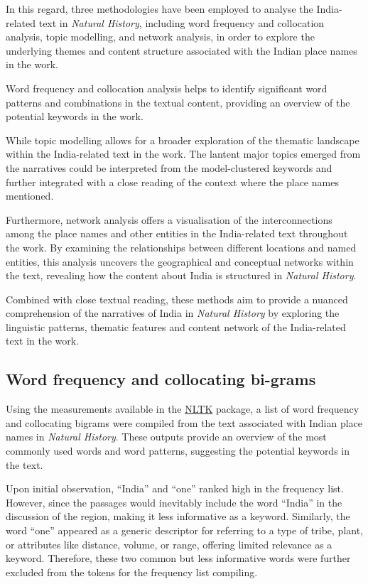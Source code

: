 \documentclass[
  12pt,
]{article}
\begin{document}
In this regard, three methodologies have been employed to analyse the
India-related text in \emph{Natural History}, including word frequency
and collocation analysis, topic modelling, and network analysis, in
order to explore the underlying themes and content structure associated
with the Indian place names in the work.

Word frequency and collocation analysis helps to identify significant
word patterns and combinations in the textual content, providing an
overview of the potential keywords in the work.

While topic modelling allows for a broader exploration of the thematic
landscape within the India-related text in the work. The lantent major
topics emerged from the narratives could be interpreted from the
model-clustered keywords and further integrated with a close reading of
the context where the place names mentioned.

Furthermore, network analysis offers a visualisation of the
interconnections among the place names and other entities in the
India-related text throughout the work. By examining the relationships
between different locations and named entities, this analysis uncovers
the geographical and conceptual networks within the text, revealing how
the content about India is structured in \emph{Natural History}.

Combined with close textual reading, these methods aim to provide a
nuanced comprehension of the narratives of India in \emph{Natural
History} by exploring the linguistic patterns, thematic features and
content network of the India-related text in the work.

\hypertarget{word-frequency-and-collocating-bi-grams}{%
\subsection{Word frequency and collocating
bi-grams}\label{word-frequency-and-collocating-bi-grams}}

Using the measurements available in the
\href{https://www.nltk.org/}{NLTK} package, a list of word frequency and
collocating bigrams were compiled from the text associated with Indian
place names in \emph{Natural History}. These outputs provide an overview
of the most commonly used words and word patterns, suggesting the
potential keywords in the text.

Upon initial observation, ``India'' and ``one'' ranked high in the
frequency list. However, since the passages would inevitably include the
word ``India'' in the discussion of the region, making it less
informative as a keyword. Similarly, the word ``one'' appeared as a
generic descriptor for referring to a type of tribe, plant, or
attributes like distance, volume, or range, offering limited relevance
as a keyword. Therefore, these two common but less informative words
were further excluded from the tokens for the frequency list compiling.
\end{document}
